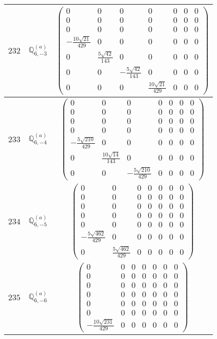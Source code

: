 \documentclass[fleqn,8pt,landscape]{jsarticle}
\begin{document}
\begin{center}
\begin{longtable}{ccc}
$ 232 $ & $ \mathbb{Q}_{6,-3}^{(a)} $ & $ \begin{pmatrix} 0 & 0 & 0 & 0 & 0 & 0 & 0 \\ 0 & 0 & 0 & 0 & 0 & 0 & 0 \\ 0 & 0 & 0 & 0 & 0 & 0 & 0 \\ - \frac{10 \sqrt{21}}{429} & 0 & 0 & 0 & 0 & 0 & 0 \\ 0 & \frac{5 \sqrt{42}}{143} & 0 & 0 & 0 & 0 & 0 \\ 0 & 0 & - \frac{5 \sqrt{42}}{143} & 0 & 0 & 0 & 0 \\ 0 & 0 & 0 & \frac{10 \sqrt{21}}{429} & 0 & 0 & 0 \end{pmatrix} $ \\ \hline
$ 233 $ & $ \mathbb{Q}_{6,-4}^{(a)} $ & $ \begin{pmatrix} 0 & 0 & 0 & 0 & 0 & 0 & 0 \\ 0 & 0 & 0 & 0 & 0 & 0 & 0 \\ 0 & 0 & 0 & 0 & 0 & 0 & 0 \\ 0 & 0 & 0 & 0 & 0 & 0 & 0 \\ - \frac{5 \sqrt{210}}{429} & 0 & 0 & 0 & 0 & 0 & 0 \\ 0 & \frac{10 \sqrt{14}}{143} & 0 & 0 & 0 & 0 & 0 \\ 0 & 0 & - \frac{5 \sqrt{210}}{429} & 0 & 0 & 0 & 0 \end{pmatrix} $ \\ \hline
$ 234 $ & $ \mathbb{Q}_{6,-5}^{(a)} $ & $ \begin{pmatrix} 0 & 0 & 0 & 0 & 0 & 0 & 0 \\ 0 & 0 & 0 & 0 & 0 & 0 & 0 \\ 0 & 0 & 0 & 0 & 0 & 0 & 0 \\ 0 & 0 & 0 & 0 & 0 & 0 & 0 \\ 0 & 0 & 0 & 0 & 0 & 0 & 0 \\ - \frac{5 \sqrt{462}}{429} & 0 & 0 & 0 & 0 & 0 & 0 \\ 0 & \frac{5 \sqrt{462}}{429} & 0 & 0 & 0 & 0 & 0 \end{pmatrix} $ \\ \hline
$ 235 $ & $ \mathbb{Q}_{6,-6}^{(a)} $ & $ \begin{pmatrix} 0 & 0 & 0 & 0 & 0 & 0 & 0 \\ 0 & 0 & 0 & 0 & 0 & 0 & 0 \\ 0 & 0 & 0 & 0 & 0 & 0 & 0 \\ 0 & 0 & 0 & 0 & 0 & 0 & 0 \\ 0 & 0 & 0 & 0 & 0 & 0 & 0 \\ 0 & 0 & 0 & 0 & 0 & 0 & 0 \\ - \frac{10 \sqrt{231}}{429} & 0 & 0 & 0 & 0 & 0 & 0 \end{pmatrix} $ \\ \hline

\end{longtable}
\end{center}
\end{document}
